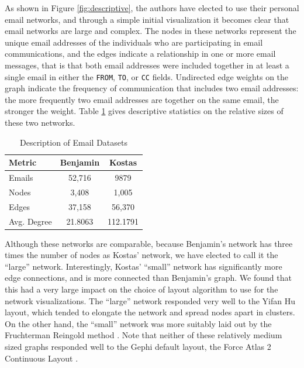 \documentclass[11pt,letterpaper]{article}
\begin{document}
As shown in Figure \ref{fig:descriptive}, the authors have elected to use their personal email networks, and through a simple initial visualization it becomes clear that email networks are large and complex.  The nodes in these networks represent the unique email addresses of the individuals who are participating in email communications, and the edges indicate a relationship in one or more email messages, that is that both email addresses were included together in at least a single email in either the \texttt{FROM}, \texttt{TO}, or \texttt{CC} fields. Undirected edge weights on the graph indicate the frequency of communication that includes two email addresses: the more frequently two email addresses are together on the same email, the stronger the weight. Table \ref{tab:network_comparison} gives descriptive statistics on the relative sizes of these two networks.

\begin{table}[t!]
    \centering
    \begin{tabular}{l | c c}
        \hline
        Metric & Benjamin & Kostas \\
        \hline
        Emails & 52,716 & 9879 \\
        Nodes & 3,408 & 1,005 \\
        Edges & 37,158 & 56,370 \\
        Avg. Degree & 21.8063 & 112.1791 \\
        \hline
    \end{tabular}
    \caption{Description of Email Datasets}
    \label{tab:network_comparison}
\end{table}

Although these networks are comparable, because Benjamin's network has three times the number of nodes as Kostas' network, we have elected to call it the ``large'' network. Interestingly, Kostas' ``small'' network has significantly more edge connections, and is more connected than Benjamin's graph. We found that this had a very large impact on the choice of layout algorithm to use for the network visualizations. The ``large'' network responded very well to the Yifan Hu \cite{hu_efficient_2005} layout, which tended to elongate the network and spread nodes apart in clusters. On the other hand, the ``small'' network was more suitably laid out by the Fruchterman Reingold method \cite{fruchterman_graph_1991}. Note that neither of these relatively medium sized graphs responded well to the Gephi default layout, the Force Atlas 2 Continuous Layout \cite{jacomy_forceatlas2_2014}.
\end{document}
